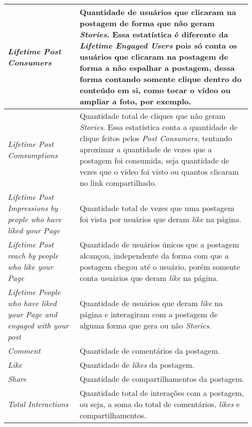 \begin{quadro}[!htb]
\begin{longtable}{|p{7cm}|p{7cm}|}
		\textit{Lifetime Post Consumers} & Quantidade de usuários que clicaram na postagem de forma que não geram \textit{Stories}. Essa estatística é diferente da \textit{Lifetime Engaged Users} pois só conta os usuários que clicaram na postagem de forma a não espalhar a postagem, dessa forma contando somente clique dentro do conteúdo em si, como tocar o vídeo ou ampliar a foto, por exemplo. \\ \hline
		\textit{Lifetime Post Comsumptions} & Quantidade total de cliques que não geram \textit{Stories}. Essa estatística conta a quantidade de clique feitos pelos \textit{Post Consumers}, tentando aproximar a quantidade de vezes que a postagem foi consumida, seja quantidade de vezes que o vídeo foi visto ou quantos clicaram no link compartilhado. \\ \hline
		\textit{Lifetime Post Impressions by people who have liked your Page} & Quantidade total de vezes que uma postagem foi vista por usuários que deram \textit{like} na página. \\ \hline
		\textit{Lifetime Post reach by people who like your Page} & Quantidade de usuários únicos que a postagem alcançou, independente da forma com que a postagem chegou até o usuário, porém somente conta usuários que deram \textit{like} na página. \\ \hline
		\textit{Lifetime People who have liked your Page and engaged with your post} & Quantidade de usuários que deram \textit{like} na página e interagiram com a postagem de alguma forma que gera ou não \textit{Stories}. \\ \hline
		\textit{Comment} & Quantidade de comentários da postagem. \\ \hline
		\textit{Like} & Quantidade de \textit{likes} da postagem. \\ \hline
		\textit{Share} & Quantidade de compartilhamentos da postagem. \\ \hline
		\textit{Total Interactions} & Quantidade total de interações com a postagem, ou seja, a soma do total de comentários, \textit{likes} e compartilhamentos. \\ \hline
    \end{longtable}
\end{quadro}